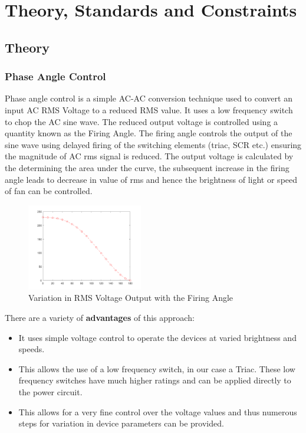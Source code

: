 \chapter{Theory, Standards and Constraints}
        \section{Theory}
        
        \subsection{Phase Angle Control}
        	
        	Phase angle control is a simple AC-AC conversion technique used to convert an input AC RMS Voltage to a reduced RMS value. It uses a low frequency switch to chop the AC sine wave. The reduced output voltage is controlled using a quantity known as the Firing Angle. The firing angle controls the output of the sine wave using delayed firing of the switching elements (triac, SCR etc.) ensuring the magnitude of AC rms signal is reduced. The output voltage is calculated by the determining the area under the curve, the subsequent increase in the firing angle leads to decrease in value of rms and hence the brightness of light or speed of fan can be controlled.\\
        	
        	
        	\begin{figure}
        		\includegraphics[width=0.45\textwidth]{photos/theory/rms_output.png}
        		\caption{Variation in RMS Voltage Output with the Firing Angle}
        	\end{figure}
        	There are a variety of \textbf{advantages} of this approach:\\
        	\begin{itemize}
        		\item It uses simple voltage control to operate the devices at varied brightness and speeds.
        		\item This allows the use of a low frequency switch, in our case a Triac. These low frequency switches have much higher ratings and can be applied directly to the power circuit.
        		\item This allows for a very fine control over the voltage values and thus numerous steps for variation in device parameters can be provided.
        	\end{itemize}
        	
